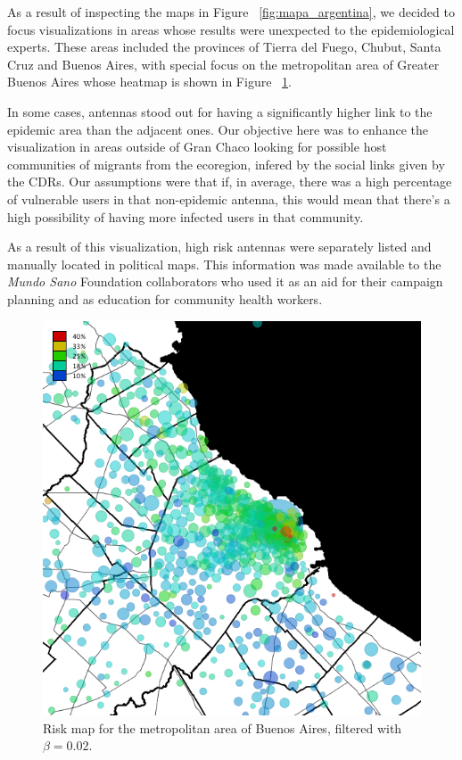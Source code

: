 As a result of inspecting the maps in Figure~ \cref{fig:mapa_argentina}, we decided to
focus visualizations in areas whose results were unexpected to the epidemiological experts.
These areas included the provinces of Tierra del Fuego, Chubut, Santa Cruz and Buenos Aires, with special focus on the metropolitan area of Greater Buenos Aires whose heatmap is shown in Figure~ \cref{fig:amba_map}.

In some cases, antennas stood out for having a significantly higher link to the epidemic area than the adjacent ones. Our objective here was to enhance the visualization in areas outside of Gran Chaco looking for possible host communities of migrants from the ecoregion, infered by the social links given by the CDRs. Our assumptions were that if, in average, there was a high percentage of vulnerable users in that non-epidemic antenna, this would mean that there's a high possibility of having more infected users in that community.

As a result of this visualization, high risk antennas were separately listed and manually located in political maps. This information was made available to the \textit{Mundo Sano} Foundation collaborators who used it as an aid for their campaign planning and as education for community health workers.


\begin{figure}[p]
	\centering
	\includegraphics[width=0.75\linewidth]
	{figures/201112_hi_res_amba_usuarios_proporcion_circulos_beta2/201112_hi_res_amba_usuarios_proporcion_circulos_beta2}
	\caption{Risk map for the metropolitan area of Buenos Aires, filtered with $\beta = 0.02$.}
	\label{fig:amba_map}
\end{figure}

